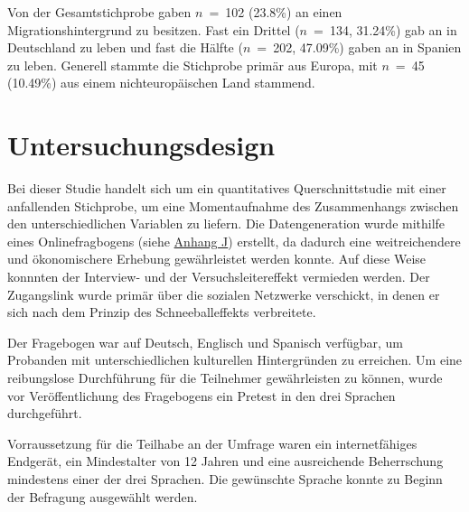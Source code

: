 Von der Gesamtstichprobe gaben $n$~=~102 (23.8\%) an einen Migrationshintergrund zu besitzen. Fast ein Drittel ($n$~=~134, 31.24\%) gab an in Deutschland zu leben und fast die Hälfte ($n$~=~202, 47.09\%) gaben an in Spanien zu leben. Generell stammte die Stichprobe primär aus Europa, mit $n$~=~45 (10.49\%) aus einem nichteuropäischen Land stammend.

\section{Untersuchungsdesign}  \label{sec_3.2}
Bei dieser Studie handelt sich um ein quantitatives Querschnittstudie mit einer anfallenden Stichprobe, um eine Momentaufnahme des Zusammenhangs zwischen den unterschiedlichen Variablen zu liefern. Die Datengeneration wurde mithilfe eines Onlinefragbogens (siehe \hyperref[Fragebogen]{Anhang J}) 
erstellt, da dadurch eine weitreichendere und ökonomischere Erhebung gewährleistet werden konnte. Auf diese Weise konnnten der Interview- und der Versuchsleitereffekt vermieden werden. Der Zugangslink wurde primär über die sozialen Netzwerke verschickt, in denen er sich nach dem Prinzip des Schneeballeffekts verbreitete.

Der Fragebogen war auf Deutsch, Englisch und Spanisch verfügbar, um Probanden mit unterschiedlichen kulturellen Hintergründen zu erreichen. 
Um eine reibungslose Durchführung für die Teilnehmer gewährleisten zu können, wurde vor Veröffentlichung des Fragebogens ein Pretest in den drei Sprachen durchgeführt.

Vorraussetzung für die Teilhabe an der Umfrage waren ein internetfähiges Endgerät, ein Mindestalter von 12 Jahren und eine ausreichende Beherrschung mindestens einer der drei Sprachen. Die gewünschte Sprache konnte zu Beginn der Befragung ausgewählt werden.


